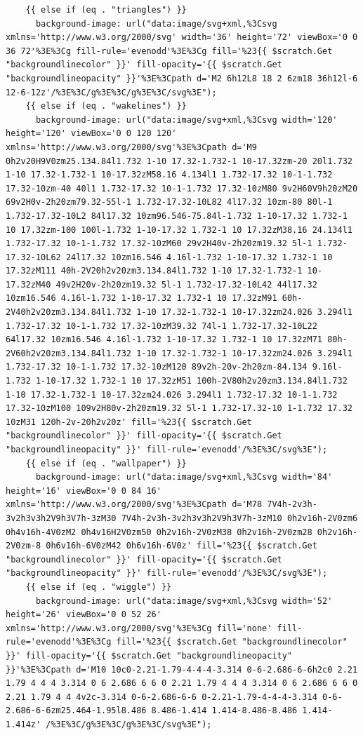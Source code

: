 \documentclass[11pt]{article}
\begin{document}
\begin{enumerate}
\begin{verbatim}
    {{ else if (eq . "triangles") }}
      background-image: url("data:image/svg+xml,%3Csvg xmlns='http://www.w3.org/2000/svg' width='36' height='72' viewBox='0 0 36 72'%3E%3Cg fill-rule='evenodd'%3E%3Cg fill='%23{{ $scratch.Get "backgroundlinecolor" }}' fill-opacity='{{ $scratch.Get "backgroundlineopacity" }}'%3E%3Cpath d='M2 6h12L8 18 2 6zm18 36h12l-6 12-6-12z'/%3E%3C/g%3E%3C/g%3E%3C/svg%3E");
    {{ else if (eq . "wakelines") }}
      background-image: url("data:image/svg+xml,%3Csvg width='120' height='120' viewBox='0 0 120 120' xmlns='http://www.w3.org/2000/svg'%3E%3Cpath d='M9 0h2v20H9V0zm25.134.84l1.732 1-10 17.32-1.732-1 10-17.32zm-20 20l1.732 1-10 17.32-1.732-1 10-17.32zM58.16 4.134l1 1.732-17.32 10-1-1.732 17.32-10zm-40 40l1 1.732-17.32 10-1-1.732 17.32-10zM80 9v2H60V9h20zM20 69v2H0v-2h20zm79.32-55l-1 1.732-17.32-10L82 4l17.32 10zm-80 80l-1 1.732-17.32-10L2 84l17.32 10zm96.546-75.84l-1.732 1-10-17.32 1.732-1 10 17.32zm-100 100l-1.732 1-10-17.32 1.732-1 10 17.32zM38.16 24.134l1 1.732-17.32 10-1-1.732 17.32-10zM60 29v2H40v-2h20zm19.32 5l-1 1.732-17.32-10L62 24l17.32 10zm16.546 4.16l-1.732 1-10-17.32 1.732-1 10 17.32zM111 40h-2V20h2v20zm3.134.84l1.732 1-10 17.32-1.732-1 10-17.32zM40 49v2H20v-2h20zm19.32 5l-1 1.732-17.32-10L42 44l17.32 10zm16.546 4.16l-1.732 1-10-17.32 1.732-1 10 17.32zM91 60h-2V40h2v20zm3.134.84l1.732 1-10 17.32-1.732-1 10-17.32zm24.026 3.294l1 1.732-17.32 10-1-1.732 17.32-10zM39.32 74l-1 1.732-17.32-10L22 64l17.32 10zm16.546 4.16l-1.732 1-10-17.32 1.732-1 10 17.32zM71 80h-2V60h2v20zm3.134.84l1.732 1-10 17.32-1.732-1 10-17.32zm24.026 3.294l1 1.732-17.32 10-1-1.732 17.32-10zM120 89v2h-20v-2h20zm-84.134 9.16l-1.732 1-10-17.32 1.732-1 10 17.32zM51 100h-2V80h2v20zm3.134.84l1.732 1-10 17.32-1.732-1 10-17.32zm24.026 3.294l1 1.732-17.32 10-1-1.732 17.32-10zM100 109v2H80v-2h20zm19.32 5l-1 1.732-17.32-10 1-1.732 17.32 10zM31 120h-2v-20h2v20z' fill='%23{{ $scratch.Get "backgroundlinecolor" }}' fill-opacity='{{ $scratch.Get "backgroundlineopacity" }}' fill-rule='evenodd'/%3E%3C/svg%3E");
    {{ else if (eq . "wallpaper") }}
      background-image: url("data:image/svg+xml,%3Csvg width='84' height='16' viewBox='0 0 84 16' xmlns='http://www.w3.org/2000/svg'%3E%3Cpath d='M78 7V4h-2v3h-3v2h3v3h2V9h3V7h-3zM30 7V4h-2v3h-3v2h3v3h2V9h3V7h-3zM10 0h2v16h-2V0zm6 0h4v16h-4V0zM2 0h4v16H2V0zm50 0h2v16h-2V0zM38 0h2v16h-2V0zm28 0h2v16h-2V0zm-8 0h6v16h-6V0zM42 0h6v16h-6V0z' fill='%23{{ $scratch.Get "backgroundlinecolor" }}' fill-opacity='{{ $scratch.Get "backgroundlineopacity" }}' fill-rule='evenodd'/%3E%3C/svg%3E");
    {{ else if (eq . "wiggle") }}
      background-image: url("data:image/svg+xml,%3Csvg width='52' height='26' viewBox='0 0 52 26' xmlns='http://www.w3.org/2000/svg'%3E%3Cg fill='none' fill-rule='evenodd'%3E%3Cg fill='%23{{ $scratch.Get "backgroundlinecolor" }}' fill-opacity='{{ $scratch.Get "backgroundlineopacity" }}'%3E%3Cpath d='M10 10c0-2.21-1.79-4-4-4-3.314 0-6-2.686-6-6h2c0 2.21 1.79 4 4 4 3.314 0 6 2.686 6 6 0 2.21 1.79 4 4 4 3.314 0 6 2.686 6 6 0 2.21 1.79 4 4 4v2c-3.314 0-6-2.686-6-6 0-2.21-1.79-4-4-4-3.314 0-6-2.686-6-6zm25.464-1.95l8.486 8.486-1.414 1.414-8.486-8.486 1.414-1.414z' /%3E%3C/g%3E%3C/g%3E%3C/svg%3E");

\end{verbatim}
\end{enumerate}
\end{document}
